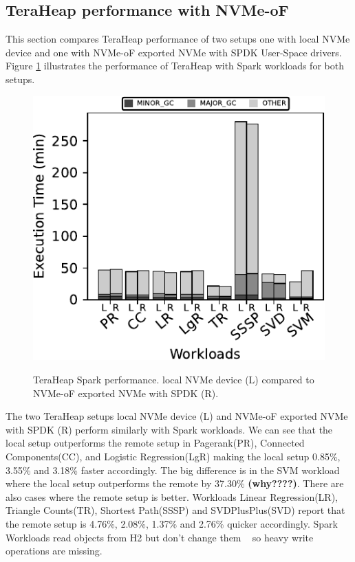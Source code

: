 \subsection{TeraHeap performance with NVMe-oF}
\par This section compares TeraHeap performance of two setups one with local NVMe device and one with NVMe-oF exported NVMe with SPDK User-Space drivers. Figure \ref{fig:bench_spark} illustrates the performance of TeraHeap with Spark workloads for both setups. 
\begin{figure}[H]
  \includegraphics[width=\linewidth]{figures/bench_spark.pdf}\\
\caption{TeraHeap Spark performance. local NVMe device (L) compared to NVMe-oF exported NVMe with SPDK (R).}
\label{fig:bench_spark}
\end{figure}
The two TeraHeap setups local NVMe device (L) and NVMe-oF exported NVMe with SPDK (R) perform similarly with Spark workloads. We can see that the local setup outperforms the remote setup in Pagerank(PR), Connected Components(CC), and Logistic Regression(LgR) making the local setup 0.85\%, 3.55\% and 3.18\% faster accordingly. The big difference is in the SVM workload where the local setup outperforms the remote by 37.30\% \textbf{(why????)}. There are also cases where the remote setup is better. Workloads Linear Regression(LR), Triangle Counts(TR), Shortest Path(SSSP) and SVDPlusPlus(SVD) report that the remote setup is 4.76\%, 2.08\%, 1.37\% and 2.76\% quicker accordingly. Spark Workloads read objects from H2 but don't change them  ~\cite{spark,teraheap} so heavy write operations are missing.

